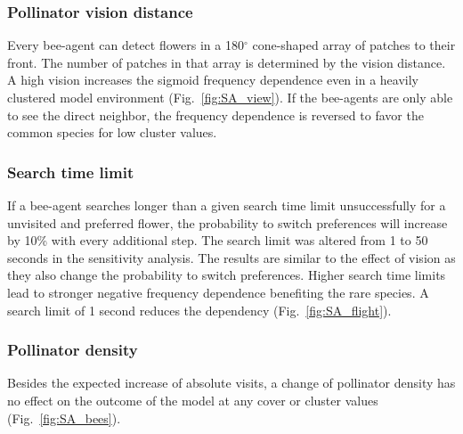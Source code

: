 
\subsubsection*{Pollinator vision distance}
Every bee-agent can detect flowers in a 180$^{\circ}$ cone-shaped array of patches to their front. The number of patches in that array is determined by the vision distance. A high vision increases the sigmoid frequency dependence even in a heavily clustered model environment (Fig.~\ref{fig:SA_view}). If the bee-agents are only able to see the direct neighbor, the frequency dependence is reversed to favor the common species for low cluster values. 


\subsubsection*{Search time limit}
If a bee-agent searches longer than a given search time limit unsuccessfully for a unvisited and preferred flower, the probability to switch preferences will increase by 10\% with every additional step. The search limit was altered from 1 to 50 seconds in the sensitivity analysis. The results are similar to the effect of vision as they also change the probability to switch preferences. Higher search time limits lead to stronger negative frequency dependence benefiting the rare species. A search limit of 1 second reduces the dependency (Fig.~\ref{fig:SA_flight}).

 
\subsubsection*{Pollinator density}
Besides the expected increase of absolute visits, a change of pollinator density has no effect on the outcome of the model at any cover or cluster values (Fig.~\ref{fig:SA_bees}).
